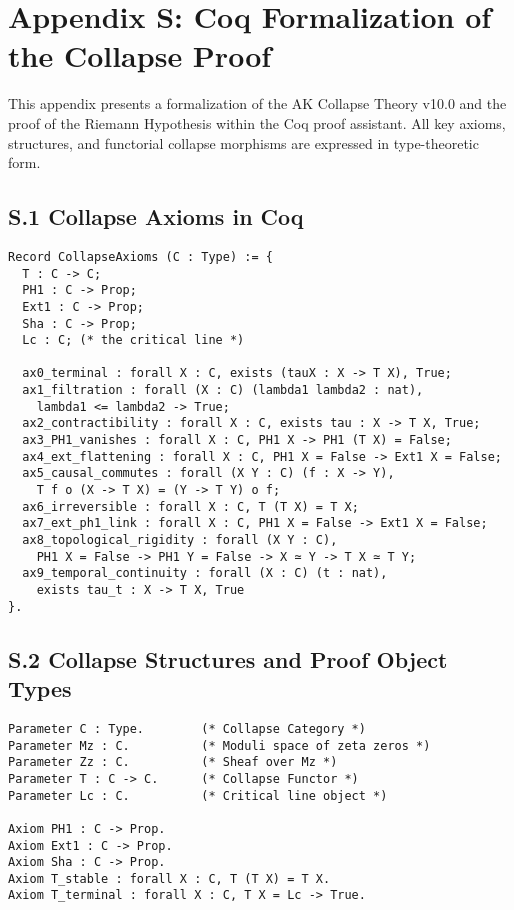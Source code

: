\documentclass[11pt]{article}
\begin{document}
\section*{Appendix S: Coq Formalization of the Collapse Proof}

This appendix presents a formalization of the AK Collapse Theory v10.0 and the proof of the Riemann Hypothesis  
within the Coq proof assistant. All key axioms, structures, and functorial collapse morphisms are expressed in type-theoretic form.

\subsection*{S.1 Collapse Axioms in Coq}

\begin{lstlisting}[caption={Collapse Axioms A0–A9}]
Record CollapseAxioms (C : Type) := {
  T : C -> C;
  PH1 : C -> Prop;
  Ext1 : C -> Prop;
  Sha : C -> Prop;
  Lc : C; (* the critical line *)

  ax0_terminal : forall X : C, exists (tauX : X -> T X), True;
  ax1_filtration : forall (X : C) (lambda1 lambda2 : nat),
    lambda1 <= lambda2 -> True;
  ax2_contractibility : forall X : C, exists tau : X -> T X, True;
  ax3_PH1_vanishes : forall X : C, PH1 X -> PH1 (T X) = False;
  ax4_ext_flattening : forall X : C, PH1 X = False -> Ext1 X = False;
  ax5_causal_commutes : forall (X Y : C) (f : X -> Y),
    T f o (X -> T X) = (Y -> T Y) o f;
  ax6_irreversible : forall X : C, T (T X) = T X;
  ax7_ext_ph1_link : forall X : C, PH1 X = False -> Ext1 X = False;
  ax8_topological_rigidity : forall (X Y : C),
    PH1 X = False -> PH1 Y = False -> X ≃ Y -> T X ≃ T Y;
  ax9_temporal_continuity : forall (X : C) (t : nat),
    exists tau_t : X -> T X, True
}.
\end{lstlisting}

\subsection*{S.2 Collapse Structures and Proof Object Types}

\begin{lstlisting}[caption={Definition of Structures}]
Parameter C : Type.        (* Collapse Category *)
Parameter Mz : C.          (* Moduli space of zeta zeros *)
Parameter Zz : C.          (* Sheaf over Mz *)
Parameter T : C -> C.      (* Collapse Functor *)
Parameter Lc : C.          (* Critical line object *)

Axiom PH1 : C -> Prop.
Axiom Ext1 : C -> Prop.
Axiom Sha : C -> Prop.
Axiom T_stable : forall X : C, T (T X) = T X.
Axiom T_terminal : forall X : C, T X = Lc -> True.
\end{lstlisting}
\end{document}
